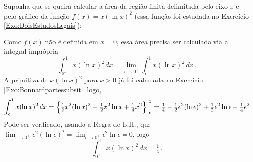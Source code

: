 \begin{ex}
Suponha que se queira calcular a área da região finita delimitada pelo
eixo $x$ e pelo gráfico da função $f(x)=x(\ln x)^2$ (essa função foi estudada no
Exercício \ref{Exo:DoisEstudosLegais}):
\begin{center}
\begin{bmlimage}\end{bmlimage}
\end{center}
Como $f(x)$ não é definida em $x=0$, essa área precisa ser calculada via a
integral imprópria 
$$
\int_{0^+}^1x(\ln x)^2\,dx=\lim_{\epsilon\to 0^+}\int_\epsilon^1 x(\ln
x)^2\,dx\,.
$$
A primitiva de $x(\ln x)^2$ para $x>0$ já foi calculada no Exercício
\ref{Exo:Bonnardpartessubsit}: logo,
$$ \int_\epsilon^1 x(\ln
x)^2\,dx=\Bigl\{
\tfrac12 x^2(\ln x)^2-\tfrac12 x^2\ln
x+\tfrac14x^2\Bigr\}\Big|_\epsilon^1=
\tfrac14-\tfrac12 \epsilon^2(\ln \epsilon)^2+\tfrac12 \epsilon^2\ln
\epsilon-\tfrac14\epsilon^2
$$
Pode ser verificado, usando a Regra de B.H., que 
$\lim_{\epsilon\to 0^+}\epsilon^2(\ln \epsilon)^2=\lim_{\epsilon\to
0^+}\epsilon^2\ln \epsilon=0$, logo
$$
\int_{0^+}^1x(\ln x)^2\,dx=\tfrac14\,.
$$
\end{ex}


